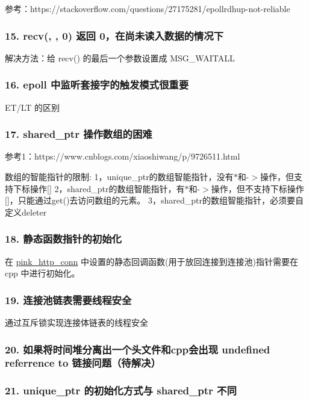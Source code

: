 参考：https\+://stackoverflow.com/questions/27175281/epollrdhup-\/not-\/reliable

\subsubsection*{15. recv(, , 0) 返回 0，在尚未读入数据的情况下}

解决方法：给 recv() 的最后一个参数设置成 M\+S\+G\+\_\+\+W\+A\+I\+T\+A\+LL

\subsubsection*{16. epoll 中监听套接字的触发模式很重要}

E\+T/\+LT 的区别

\subsubsection*{17. shared\+\_\+ptr 操作数组的困难}

参考1：https\+://www.cnblogs.\+com/xiaoshiwang/p/9726511.html

数组的智能指针的限制\+: 1，unique\+\_\+ptr的数组智能指针，没有$\ast$和-\/$>$操作，但支持下标操作\mbox{[}\mbox{]} 2，shared\+\_\+ptr的数组智能指针，有$\ast$和-\/$>$操作，但不支持下标操作\mbox{[}\mbox{]}，只能通过get()去访问数组的元素。 3，shared\+\_\+ptr的数组智能指针，必须要自定义deleter

\subsubsection*{18. 静态函数指针的初始化}

在 \hyperlink{classpink__http__conn}{pink\+\_\+http\+\_\+conn} 中设置的静态回调函数(用于放回连接到连接池)指针需要在 cpp 中进行初始化。

\subsubsection*{19. 连接池链表需要线程安全}

通过互斥锁实现连接体链表的线程安全

\subsubsection*{20. 如果将时间堆分离出一个头文件和cpp会出现 undefined referrence to 链接问题（待解决）}

\subsubsection*{21. unique\+\_\+ptr 的初始化方式与 shared\+\_\+ptr 不同}

